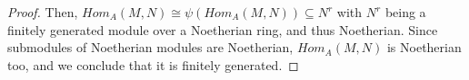 \begin{problem}
\begin{enumerate}[label=(\theproblem.\arabic*),ref=\theproblem.\arabic*]
\begin{sol}
\begin{proof}
                    Then, $Hom_A(M,N) \cong \psi(Hom_A(M,N)) \subseteq N^r$ with $N^r$
                    being a finitely generated module over a Noetherian ring, and thus Noetherian.
                    Since submodules of Noetherian modules are Noetherian, $Hom_A(M,N)$ is Noetherian too,
                    and we conclude that it is finitely generated.

                \end{proof}
            \end{sol}
    \end{enumerate}
\end{problem}